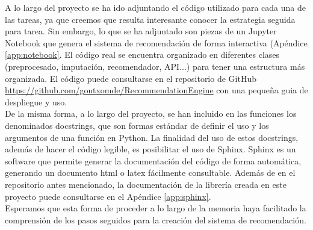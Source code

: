A lo largo del proyecto se ha ido adjuntando el código utilizado para cada una de las tareas, ya que creemos que resulta interesante conocer la estrategia seguida para tarea. Sin embargo, lo que se ha adjuntado son piezas de un Jupyter Notebook que genera el sistema de recomendación de forma interactiva (Apéndice \ref{app:notebook}. El código real se encuentra organizado en diferentes clases (preprocesado, imputación, recomendador, API...) para tener una estructura más organizada. El código puede consultarse en el repositorio de GitHub \url{https://github.com/gontxomde/RecommendationEngine} con una pequeña guia de despliegue y uso.\\

De la misma forma, a lo largo del proyecto, se han incluido en las funciones los denominados docstrings, que son formas estándar de definir el uso y los argumentos de una función en Python. La finalidad del uso de estos docstrings, además de hacer el código legible, es posibilitar el uso de Sphinx. Sphinx es un software que permite generar la documentación del código de forma automática, generando un documento html o latex fácilmente consultable. Además de en el repositorio antes mencionado, la documentación de la librería creada en este proyecto puede consultarse en el Apéndice \ref{app:sphinx}.\\

Esperamos que esta forma de proceder a lo largo de la memoria haya facilitado la comprensión de los pasos seguidos para la creación del sistema de recomendación.


